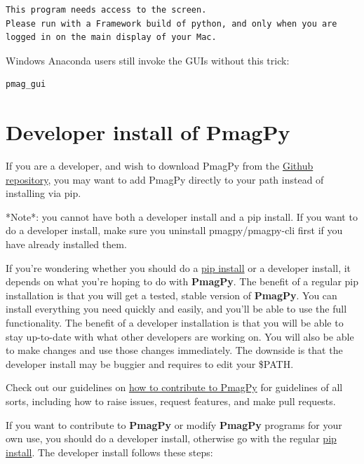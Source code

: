\documentclass[11pt]{book}
\begin{document}
{\begin{verbatim}
This program needs access to the screen.
Please run with a Framework build of python, and only when you are
logged in on the main display of your Mac.
\end{verbatim}

\noindent Windows Anaconda users still invoke the GUIs without this trick:

\begin{verbatim}
pmag_gui
\end{verbatim}


\section{Developer install of PmagPy}

If you are a developer, and wish to download PmagPy from the \href{https://github.com/PmagPy/PmagPy}{Github repository}, you may want to add PmagPy directly to your path instead of installing via pip.

*Note*: you cannot have both a developer install and a pip install.  If you want to do a developer install, make sure you uninstall pmagpy/pmagpy-cli first if you have already installed them.

If you're wondering whether you should do a \href{#pip_install}{pip install} or a developer install, it depends on what you're hoping to do with {\bf PmagPy}.  The benefit of a regular pip installation is that you will get a tested, stable version of {\bf PmagPy}.  You can install everything you need quickly and easily, and you'll be able to use the full functionality.  The benefit of a developer installation is that you will be able to stay up-to-date with what other developers are working on.  You will also be able to make changes and use those changes immediately.  The downside is that the developer install may be buggier and requires to edit your \$PATH.

Check out our guidelines on \href{https://github.com/PmagPy/PmagPy/blob/master/CONTRIBUTING.md}{how to contribute to PmagPy} for guidelines of all sorts, including how to raise issues, request features, and make pull requests.

If you want to contribute to {\bf PmagPy} or modify {\bf PmagPy} programs for your own use, you should do a developer install, otherwise go with the regular \href{#pip_install}{pip install}.  The developer install follows these steps:

}
\end{document}
